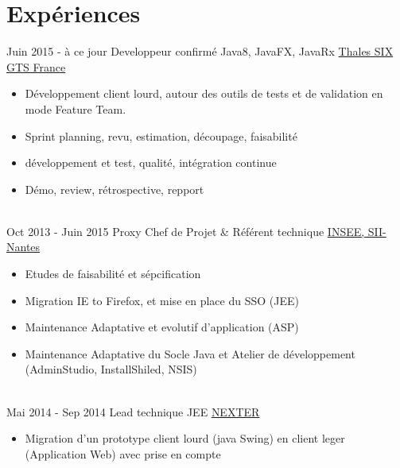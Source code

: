 \documentclass[letterpaper]{twentysecondcv} %
\begin{document}
\makeprofile %


\section{Expériences}

\begin{twenty} %
\twentyitem
    	{Juin 2015 -}
		{à ce jour}
        {Developpeur confirmé Java8, JavaFX, JavaRx}
        {\href{https://www.thalesgroup.com/fr}{Thales SIX GTS France}}
        {}
        {\begin{itemize} 		
      	\item Développement client lourd, autour des outils de tests et de validation en mode Feature Team.
        \item Sprint planning, revu, estimation, découpage, faisabilité
        \item développement et test, qualité, intégration continue
        \item Démo, review, rétrospective, repport
        \end{itemize}}
        \\
	\twentyitem
    	{Oct 2013 -}
		{Juin 2015}
        {Proxy Chef de Projet \& Référent technique}
        {\href{https://www.insee.fr/fr/accueil}{INSEE, SII-Nantes}}
        {}
        {
        {\begin{itemize}
		\item Etudes de faisabilité et sépcification 
		\item Migration IE to Firefox, et mise en place du SSO (JEE)
		\item Maintenance Adaptative et evolutif d'application (ASP)
		\item Maintenance Adaptative du Socle Java et Atelier de développement (AdminStudio, InstallShiled, NSIS)
    \end{itemize}}
        }
    \\   
    \twentyitem
   		{Mai 2014 -}
		{Sep 2014}
        {Lead technique JEE}
        {\href{https://www.nexter-group.fr/}{NEXTER}}
        {}
        {
        {\begin{itemize}
     		\item Migration d'un prototype client lourd (java Swing) en client leger (Application Web) avec prise en compte

\end{itemize}}}
\end{twenty}
\end{document}
